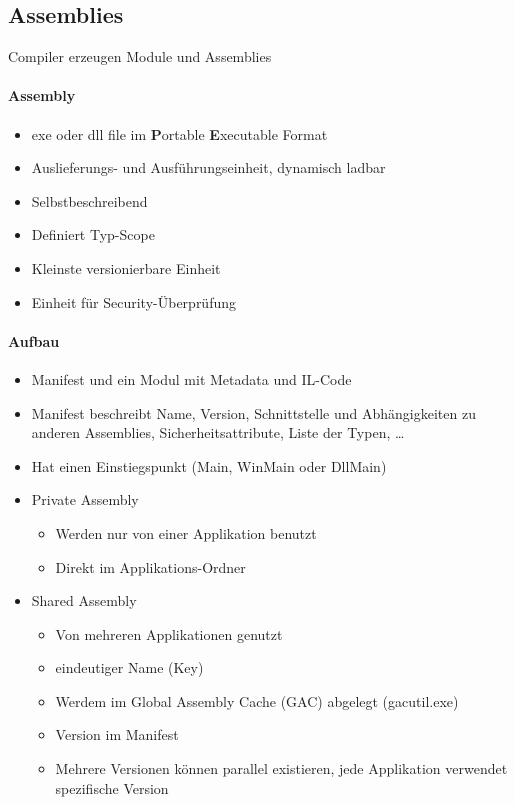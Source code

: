 \subsection{Assemblies}
Compiler erzeugen Module und Assemblies
\paragraph{Assembly}
\begin{itemize}
	\item exe oder dll file im \textbf{P}ortable \textbf{E}xecutable Format
	\item Auslieferungs- und Ausführungseinheit, dynamisch ladbar
	\item Selbstbeschreibend
	\item Definiert Typ-Scope
	\item Kleinste versionierbare Einheit
	\item Einheit für Security-Überprüfung
\end{itemize}
\paragraph{Aufbau}
\begin{itemize}
	\item Manifest und ein Modul mit Metadata und IL-Code
	\item Manifest beschreibt Name, Version, Schnittstelle und Abhängigkeiten zu anderen Assemblies, Sicherheitsattribute, Liste der Typen, \dots
	\item Hat einen Einstiegspunkt (Main, WinMain oder DllMain)
	\item Private Assembly
		\begin{itemize}
			\item Werden nur von einer Applikation benutzt
			\item Direkt im Applikations-Ordner
		\end{itemize}
	\item Shared Assembly
		\begin{itemize}
			\item Von mehreren Applikationen genutzt
			\item eindeutiger Name (Key)
			\item Werdem im Global Assembly Cache (GAC) abgelegt (gacutil.exe)
			\item Version im Manifest
			\item Mehrere Versionen können parallel existieren, jede Applikation verwendet spezifische Version
		\end{itemize}
\end{itemize}

